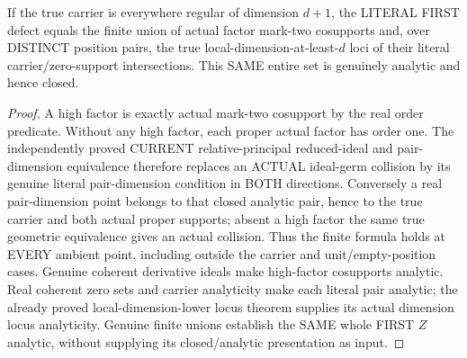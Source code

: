 \begin{theorem}
\label{hir:sharp-actual-chronological-distinct-defect-finite-analytic-formula}
\leanok
If the true carrier is everywhere regular of dimension $d+1$, the LITERAL
FIRST defect equals the finite union of actual factor mark-two cosupports
and, over DISTINCT position pairs, the true local-dimension-at-least-$d$
loci of their literal carrier/zero-support intersections. This SAME entire
set is genuinely analytic and hence closed.
\end{theorem}
\begin{proof}
A high factor is exactly actual mark-two cosupport by the real order
predicate. Without any high factor, each proper actual factor has order
one. The independently proved CURRENT relative-principal reduced-ideal
and pair-dimension equivalence therefore replaces an ACTUAL ideal-germ
collision by its genuine literal pair-dimension condition in BOTH directions.
Conversely a real pair-dimension point belongs to that closed analytic pair,
hence to the true carrier and both actual proper supports; absent a high
factor the same true geometric equivalence gives an actual collision.
Thus the finite formula holds at EVERY ambient point, including outside
the carrier and unit/empty-position cases. Genuine coherent derivative
ideals make high-factor cosupports analytic. Real coherent zero sets and
carrier analyticity make each literal pair analytic; the already proved
local-dimension-lower locus theorem supplies its actual dimension locus
analyticity. Genuine finite unions establish the SAME whole FIRST $Z$
analytic, without supplying its closed/analytic presentation as input.
\end{proof}

